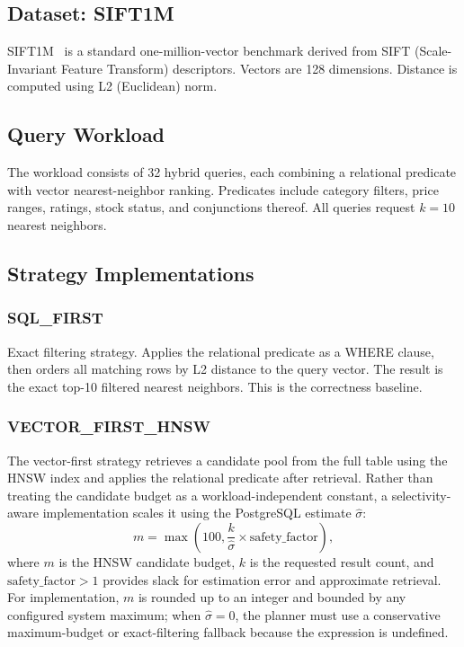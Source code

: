 \documentclass[10pt,twocolumn]{article}
\begin{document}
\subsection{Dataset: SIFT1M}

SIFT1M~\cite{sift1m} is a standard one-million-vector benchmark derived from SIFT (Scale-Invariant Feature Transform) descriptors. Vectors are 128 dimensions. Distance is computed using L2 (Euclidean) norm.

\subsection{Query Workload}

The workload consists of 32 hybrid queries, each combining a relational predicate with vector nearest-neighbor ranking. Predicates include category filters, price ranges, ratings, stock status, and conjunctions thereof. All queries request $k = 10$ nearest neighbors.

\subsection{Strategy Implementations}

\subsubsection{SQL\_FIRST}

Exact filtering strategy. Applies the relational predicate as a WHERE clause, then orders all matching rows by L2 distance to the query vector. The result is the exact top-10 filtered nearest neighbors. This is the correctness baseline.

\subsubsection{VECTOR\_FIRST\_HNSW}

The vector-first strategy retrieves a candidate pool from the full table using the HNSW index and applies the relational predicate after retrieval. Rather than treating the candidate budget as a workload-independent constant, a selectivity-aware implementation scales it using the PostgreSQL estimate $\hat{\sigma}$:
\begin{equation}
m = \max\left(100, \frac{k}{\hat{\sigma}} \times \text{safety\_factor}\right),
\label{eq:dynamic-candidate-budget}
\end{equation}
where $m$ is the HNSW candidate budget, $k$ is the requested result count, and $\text{safety\_factor} > 1$ provides slack for estimation error and approximate retrieval. For implementation, $m$ is rounded up to an integer and bounded by any configured system maximum; when $\hat{\sigma}=0$, the planner must use a conservative maximum-budget or exact-filtering fallback because the expression is undefined.
\end{document}
